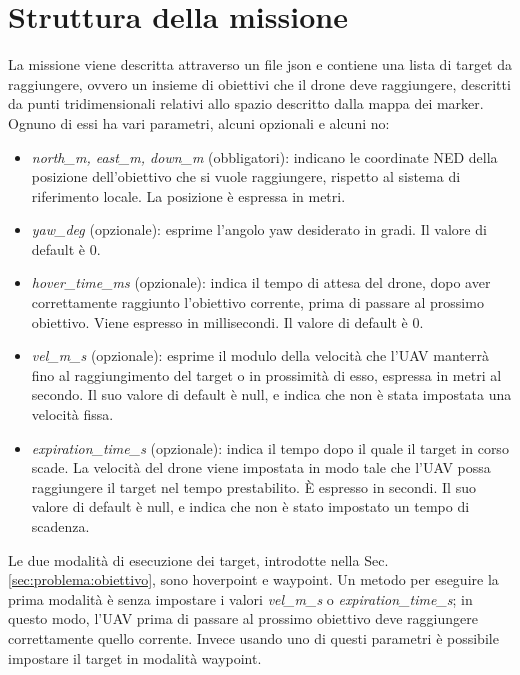 \section{Struttura della missione}
\label{sec:problema:missione}
La missione viene descritta attraverso un file json e contiene una lista di target da raggiungere, ovvero un insieme di obiettivi che il drone deve raggiungere, descritti da punti tridimensionali relativi allo spazio descritto dalla mappa dei marker. Ognuno di essi ha vari parametri, alcuni opzionali e alcuni no:
\begin{itemize}
	\item {\em north\_m, east\_m, down\_m} (obbligatori): indicano le coordinate NED della posizione dell'obiettivo che si vuole raggiungere, rispetto al sistema di riferimento locale. La posizione è espressa in metri.
	\item {\em yaw\_deg} (opzionale): esprime l'angolo yaw desiderato in gradi. Il valore di default è 0.
	\item {\em hover\_time\_ms} (opzionale): indica il tempo di attesa del drone, dopo aver correttamente raggiunto l'obiettivo corrente, prima di passare al prossimo obiettivo. Viene espresso in millisecondi. Il valore di default è 0.
	\item {\em vel\_m\_s} (opzionale): esprime il modulo della velocità che l'UAV manterrà fino al raggiungimento del target o in prossimità di esso, espressa in metri al secondo. Il suo valore di default è null, e indica che non è stata impostata una velocità fissa.
	\item {\em expiration\_time\_s} (opzionale): indica il tempo dopo il quale il target in corso scade. La velocità del drone viene impostata in modo tale che l'UAV possa raggiungere il target nel tempo prestabilito. È espresso in secondi. Il suo valore di default è null, e indica che non è stato impostato un tempo di scadenza.
\end{itemize}
Le due modalità di esecuzione dei target, introdotte nella Sec. \ref{sec:problema:obiettivo}, sono hoverpoint e waypoint. Un metodo per eseguire la prima modalità è senza impostare i valori {\em vel\_m\_s} o {\em expiration\_time\_s}; in questo modo, l'UAV prima di passare al prossimo obiettivo deve raggiungere correttamente quello corrente. Invece usando uno di questi parametri è possibile impostare il target in modalità waypoint.